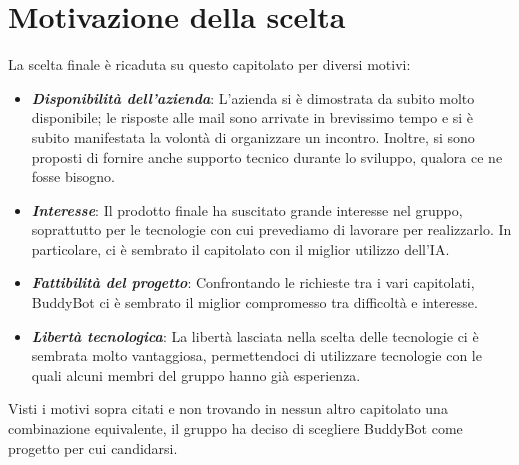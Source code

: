 \section{Motivazione della scelta}

La scelta finale è ricaduta su questo capitolato per diversi motivi:
\begin{itemize}
    \item \textit{\textbf{Disponibilità dell'azienda}}: L'azienda si è dimostrata da subito molto disponibile; le risposte alle mail sono arrivate in brevissimo tempo e si è subito manifestata la volontà di organizzare un incontro. Inoltre, si sono proposti di fornire anche supporto tecnico durante lo sviluppo, qualora ce ne fosse bisogno.
    \item \textit{\textbf{Interesse}}: Il prodotto finale ha suscitato grande interesse nel gruppo, soprattutto per le tecnologie con cui prevediamo di lavorare per realizzarlo. In particolare, ci è sembrato il capitolato con il miglior utilizzo dell'IA.
    \item \textit{\textbf{Fattibilità del progetto}}: Confrontando le richieste tra i vari capitolati, BuddyBot ci è sembrato il miglior compromesso tra difficoltà e interesse.
    \item \textit{\textbf{Libertà tecnologica}}: La libertà lasciata nella scelta delle tecnologie ci è sembrata molto vantaggiosa, permettendoci di utilizzare tecnologie con le quali alcuni membri del gruppo hanno già esperienza.
\end{itemize}

Visti i motivi sopra citati e non trovando in nessun altro capitolato una combinazione equivalente, 
il gruppo ha deciso di scegliere BuddyBot come progetto per cui candidarsi.